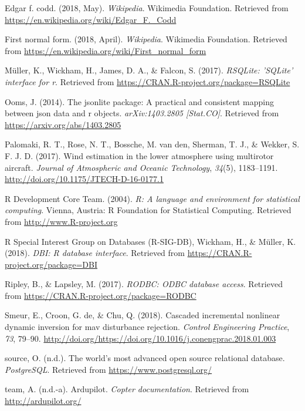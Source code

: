 \documentclass[12pt,oneside]{reedthesis}
\theoremstyle{definition}
\theoremstyle{definition}
\theoremstyle{definition}
\theoremstyle{remark}
\begin{document}
\hypertarget{ref-codd}{}
Edgar f. codd. (2018, May). \emph{Wikipedia}. Wikimedia Foundation.
Retrieved from \url{https://en.wikipedia.org/wiki/Edgar_F._Codd}

\hypertarget{ref-1fn}{}
First normal form. (2018, April). \emph{Wikipedia}. Wikimedia
Foundation. Retrieved from
\url{https://en.wikipedia.org/wiki/First_normal_form}

\hypertarget{ref-5}{}
Müller, K., Wickham, H., James, D. A., \& Falcon, S. (2017).
\emph{RSQLite: 'SQLite' interface for r}. Retrieved from
\url{https://CRAN.R-project.org/package=RSQLite}

\hypertarget{ref-jlite}{}
Ooms, J. (2014). The jsonlite package: A practical and consistent
mapping between json data and r objects. \emph{arXiv:1403.2805
{[}Stat.CO{]}}. Retrieved from \url{https://arxiv.org/abs/1403.2805}

\hypertarget{ref-wind}{}
Palomaki, R. T., Rose, N. T., Bossche, M. van den, Sherman, T. J., \&
Wekker, S. F. J. D. (2017). Wind estimation in the lower atmosphere
using multirotor aircraft. \emph{Journal of Atmospheric and Oceanic
Technology}, \emph{34}(5), 1183--1191.
\url{http://doi.org/10.1175/JTECH-D-16-0177.1}

\hypertarget{ref-r}{}
R Development Core Team. (2004). \emph{R: A language and environment for
statistical computing}. Vienna, Austria: R Foundation for Statistical
Computing. Retrieved from \url{http://www.R-project.org}

\hypertarget{ref-6}{}
R Special Interest Group on Databases (R-SIG-DB), Wickham, H., \&
Müller, K. (2018). \emph{DBI: R database interface}. Retrieved from
\url{https://CRAN.R-project.org/package=DBI}

\hypertarget{ref-1}{}
Ripley, B., \& Lapsley, M. (2017). \emph{RODBC: ODBC database access}.
Retrieved from \url{https://CRAN.R-project.org/package=RODBC}

\hypertarget{ref-indi}{}
Smeur, E., Croon, G. de, \& Chu, Q. (2018). Cascaded incremental
nonlinear dynamic inversion for mav disturbance rejection. \emph{Control
Engineering Practice}, \emph{73}, 79--90.
\url{http://doi.org/https://doi.org/10.1016/j.conengprac.2018.01.003}

\hypertarget{ref-postgresql}{}
source, O. (n.d.). The world's most advanced open source relational
database. \emph{PostgreSQL}. Retrieved from
\url{https://www.postgresql.org/}

\hypertarget{ref-ardu}{}
team, A. (n.d.-a). Ardupilot. \emph{Copter documentation}. Retrieved
from \url{http://ardupilot.org/}
\end{document}
